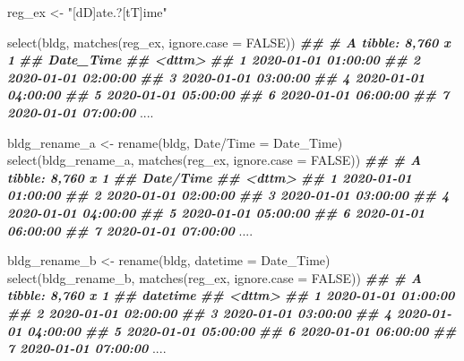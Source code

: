 \documentclass[
]{book}
\newenvironment{Shaded}{\begin{snugshade}}{\end{snugshade}}
\newcommand{\AttributeTok}[1]{\textcolor[rgb]{0.77,0.63,0.00}{#1}}
\newcommand{\ConstantTok}[1]{\textcolor[rgb]{0.00,0.00,0.00}{#1}}
\newcommand{\DocumentationTok}[1]{\textcolor[rgb]{0.56,0.35,0.01}{\textbf{\textit{#1}}}}
\newcommand{\FunctionTok}[1]{\textcolor[rgb]{0.00,0.00,0.00}{#1}}
\newcommand{\NormalTok}[1]{#1}
\newcommand{\OtherTok}[1]{\textcolor[rgb]{0.56,0.35,0.01}{#1}}
\newcommand{\StringTok}[1]{\textcolor[rgb]{0.31,0.60,0.02}{#1}}
\begin{document}
\begin{Shaded}
\begin{Highlighting}[]
\NormalTok{reg\_ex }\OtherTok{\textless{}{-}} \StringTok{"[dD]ate.?[tT]ime"}

\FunctionTok{select}\NormalTok{(bldg, }\FunctionTok{matches}\NormalTok{(reg\_ex, }\AttributeTok{ignore.case =} \ConstantTok{FALSE}\NormalTok{))}
\DocumentationTok{\#\# \# A tibble: 8,760 x 1}
\DocumentationTok{\#\#    Date\_Time          }
\DocumentationTok{\#\#    \textless{}dttm\textgreater{}             }
\DocumentationTok{\#\#  1 2020{-}01{-}01 01:00:00}
\DocumentationTok{\#\#  2 2020{-}01{-}01 02:00:00}
\DocumentationTok{\#\#  3 2020{-}01{-}01 03:00:00}
\DocumentationTok{\#\#  4 2020{-}01{-}01 04:00:00}
\DocumentationTok{\#\#  5 2020{-}01{-}01 05:00:00}
\DocumentationTok{\#\#  6 2020{-}01{-}01 06:00:00}
\DocumentationTok{\#\#  7 2020{-}01{-}01 07:00:00}
\NormalTok{....}

\NormalTok{bldg\_rename\_a }\OtherTok{\textless{}{-}} \FunctionTok{rename}\NormalTok{(bldg, }\StringTok{\textasciigrave{}}\AttributeTok{Date/Time}\StringTok{\textasciigrave{}} \OtherTok{=} \StringTok{\textasciigrave{}}\AttributeTok{Date\_Time}\StringTok{\textasciigrave{}}\NormalTok{)}
\FunctionTok{select}\NormalTok{(bldg\_rename\_a, }\FunctionTok{matches}\NormalTok{(reg\_ex, }\AttributeTok{ignore.case =} \ConstantTok{FALSE}\NormalTok{))}
\DocumentationTok{\#\# \# A tibble: 8,760 x 1}
\DocumentationTok{\#\#    \textasciigrave{}Date/Time\textasciigrave{}        }
\DocumentationTok{\#\#    \textless{}dttm\textgreater{}             }
\DocumentationTok{\#\#  1 2020{-}01{-}01 01:00:00}
\DocumentationTok{\#\#  2 2020{-}01{-}01 02:00:00}
\DocumentationTok{\#\#  3 2020{-}01{-}01 03:00:00}
\DocumentationTok{\#\#  4 2020{-}01{-}01 04:00:00}
\DocumentationTok{\#\#  5 2020{-}01{-}01 05:00:00}
\DocumentationTok{\#\#  6 2020{-}01{-}01 06:00:00}
\DocumentationTok{\#\#  7 2020{-}01{-}01 07:00:00}
\NormalTok{....}


\NormalTok{bldg\_rename\_b }\OtherTok{\textless{}{-}} \FunctionTok{rename}\NormalTok{(bldg, }\StringTok{\textasciigrave{}}\AttributeTok{datetime}\StringTok{\textasciigrave{}} \OtherTok{=} \StringTok{\textasciigrave{}}\AttributeTok{Date\_Time}\StringTok{\textasciigrave{}}\NormalTok{)}
\FunctionTok{select}\NormalTok{(bldg\_rename\_b, }\FunctionTok{matches}\NormalTok{(reg\_ex, }\AttributeTok{ignore.case =} \ConstantTok{FALSE}\NormalTok{))}
\DocumentationTok{\#\# \# A tibble: 8,760 x 1}
\DocumentationTok{\#\#    datetime           }
\DocumentationTok{\#\#    \textless{}dttm\textgreater{}             }
\DocumentationTok{\#\#  1 2020{-}01{-}01 01:00:00}
\DocumentationTok{\#\#  2 2020{-}01{-}01 02:00:00}
\DocumentationTok{\#\#  3 2020{-}01{-}01 03:00:00}
\DocumentationTok{\#\#  4 2020{-}01{-}01 04:00:00}
\DocumentationTok{\#\#  5 2020{-}01{-}01 05:00:00}
\DocumentationTok{\#\#  6 2020{-}01{-}01 06:00:00}
\DocumentationTok{\#\#  7 2020{-}01{-}01 07:00:00}
\NormalTok{....}
\end{Highlighting}
\end{Shaded}
\end{document}
